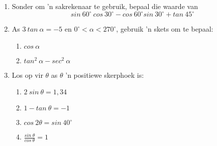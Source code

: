 \begin{eocexercises}{}

\begin{enumerate}[itemsep=6pt, label=\textbf{\arabic*}. ] 
\item Sonder om 'n sakrekenaar te gebruik, bepaal die waarde van
\begin{equation*}
sin~60^{\circ}~cos~30^{\circ}-cos~60^{\circ}sin~30^{\circ} + tan~45^{\circ}
\end{equation*}
\item As $3~tan~\alpha = -5$ en $0^{\circ} < \alpha < 270^{\circ}$, gebruik 'n skets om te bepaal:
    \begin{enumerate}[noitemsep, label=\textbf{(\alph*)} ]
    \item $cos~\alpha$
    \item $tan^{2}~\alpha - sec^{2}~\alpha$
    \end{enumerate}
\item Los op vir $\theta$ as $\theta$ 'n positiewe skerphoek is:
    \begin{enumerate}[noitemsep, label=\textbf{(\alph*)} ]
    \item $2~sin~\theta = 1,34$
    \item $1 - tan~\theta = -1$
    \item $cos~2\theta = sin~40^{\circ}$ 
    \item $\frac{sin~\theta}{cos~\theta}= 1$
    \end{enumerate}



\end{enumerate}
\end{eocexercises}
